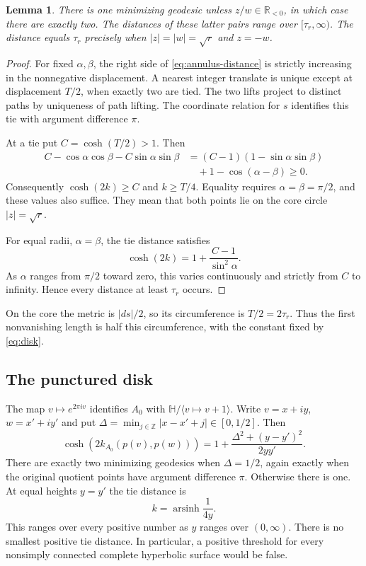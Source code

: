 \documentclass[12pt]{amsart}
\newtheorem{lem}[thm]{Lemma}
\theoremstyle{definition}
\theoremstyle{remark}
\numberwithin{equation}{section}
\newcommand{\R}{\mathbb{R}}
\newcommand{\Z}{\mathbb{Z}}
\begin{document}
\begin{lem}\label{lem:annulus-cuts}
There is one minimizing geodesic unless $z/w\in\R_{<0}$, in which case there are exactly two. The distances of these latter pairs range over $[\tau_r,\infty)$. The distance equals $\tau_r$ precisely when $|z|=|w|=\sqrt r$ and $z=-w$.
\end{lem}
\begin{proof}
For fixed $\alpha,\beta$, the right side of \eqref{eq:annulus-distance} is strictly increasing in the nonnegative displacement. A nearest integer translate is unique except at displacement $T/2$, when exactly two are tied. The two lifts project to distinct paths by uniqueness of path lifting. The coordinate relation for $s$ identifies this tie with argument difference $\pi$.

At a tie put $C=\cosh(T/2)>1$. Then
\begin{align*}
 C-\cos\alpha\cos\beta-C\sin\alpha\sin\beta
 &=(C-1)(1-\sin\alpha\sin\beta)\\
 &\quad+1-\cos(\alpha-\beta)\ge0.
\end{align*}
Consequently $\cosh(2k)\ge C$ and $k\ge T/4$. Equality requires $\alpha=\beta=\pi/2$, and these values also suffice. They mean that both points lie on the core circle $|z|=\sqrt r$.

For equal radii, $\alpha=\beta$, the tie distance satisfies
\begin{equation}\label{eq:equal-radius}
 \cosh(2k)=1+\frac{C-1}{\sin^2\alpha}.
\end{equation}
As $\alpha$ ranges from $\pi/2$ toward zero, this varies continuously and strictly from $C$ to infinity. Hence every distance at least $\tau_r$ occurs.
\end{proof}
On the core the metric is $|ds|/2$, so its circumference is $T/2=2\tau_r$. Thus the first nonvanishing length is half this circumference, with the constant fixed by \eqref{eq:disk}.

\subsection{The punctured disk}
The map $v\mapsto e^{2\pi i v}$ identifies $A_0$ with $\mathbb H/\langle v\mapsto v+1\rangle$. Write $v=x+iy$, $w=x'+iy'$ and put $\Delta=\min_{j\in\Z}|x-x'+j|\in[0,1/2]$. Then
\begin{equation}\label{eq:cusp-distance}
 \cosh(2k_{A_0}(p(v),p(w)))=1+\frac{\Delta^2+(y-y')^2}{2yy'}.
\end{equation}
There are exactly two minimizing geodesics when $\Delta=1/2$, again exactly when the original quotient points have argument difference $\pi$. Otherwise there is one. At equal heights $y=y'$ the tie distance is
\begin{equation}\label{eq:cusp-equal-height}
 k=\operatorname{arsinh}\frac1{4y}.
\end{equation}
This ranges over every positive number as $y$ ranges over $(0,\infty)$. There is no smallest positive tie distance. In particular, a positive threshold for every nonsimply connected complete hyperbolic surface would be false.
\end{document}
